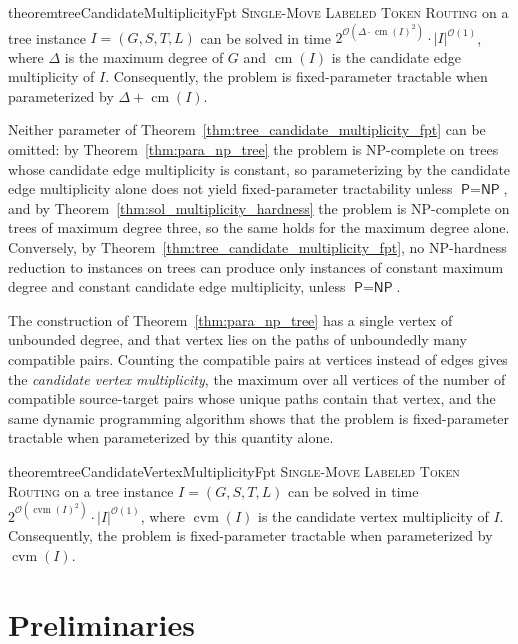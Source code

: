 \documentclass[a4paper,USenglish,thm-restate]{lipics-v2021}
\newcommand{\cm}{\operatorname{cm}}
\newcommand{\cvm}{\operatorname{cvm}}
\theoremstyle{problemstyle}
\begin{document}
\begin{restatable}{theorem}{treeCandidateMultiplicityFpt}
\label{thm:tree_candidate_multiplicity_fpt}
\textsc{Single-Move Labeled Token Routing} on a tree instance $I=(G,S,T,L)$ can
be solved in time $2^{\mathcal{O}(\Delta\cdot \cm(I)^2)}\cdot |I|^{\mathcal{O}(1)}$,
where $\Delta$ is the maximum degree of $G$ and $\cm(I)$ is the candidate edge
multiplicity of $I$. Consequently, the problem is fixed-parameter tractable when
parameterized by $\Delta+\cm(I)$.
\end{restatable}


Neither parameter of Theorem~\ref{thm:tree_candidate_multiplicity_fpt} can be
omitted: by Theorem~\ref{thm:para_np_tree} the problem is
\textsf{NP}-complete on trees whose candidate edge multiplicity is constant,
so parameterizing by the candidate edge multiplicity alone does not yield
fixed-parameter tractability unless $\textsf{P}=\textsf{NP}$, and by
Theorem~\ref{thm:sol_multiplicity_hardness} the problem is
\textsf{NP}-complete on trees of maximum degree three, so the same holds for
the maximum degree alone. Conversely, by
Theorem~\ref{thm:tree_candidate_multiplicity_fpt}, no \textsf{NP}-hardness
reduction to instances on trees can produce only instances of constant maximum
degree and constant candidate edge multiplicity, unless
$\textsf{P}=\textsf{NP}$.

The construction of Theorem~\ref{thm:para_np_tree} has a single vertex of
unbounded degree, and that vertex lies on the paths of unboundedly many
compatible pairs. Counting the compatible pairs at vertices instead of edges
gives the \emph{candidate vertex multiplicity}, the maximum over all vertices
of the number of compatible source-target pairs whose unique paths contain
that vertex, and the same dynamic programming algorithm shows that the
problem is fixed-parameter tractable when parameterized by this quantity
alone.


\begin{restatable}{theorem}{treeCandidateVertexMultiplicityFpt}
\label{thm:tree_cvm_fpt}
\textsc{Single-Move Labeled Token Routing} on a tree instance $I=(G,S,T,L)$
can be solved in time $2^{\mathcal{O}(\cvm(I)^2)}\cdot|I|^{\mathcal{O}(1)}$,
where $\cvm(I)$ is the candidate vertex multiplicity of $I$. Consequently,
the problem is fixed-parameter tractable when parameterized by $\cvm(I)$.
\end{restatable}


\section{Preliminaries}
\label{sec:prelim}
\end{document}
